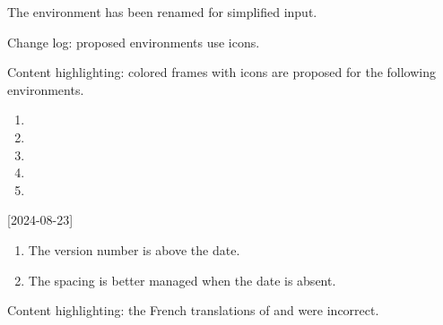 \begin{tdocbreak}
    \item The  environment has been renamed  for simplified input.
\end{tdocbreak}


\begin{tdocnew}
    \item Change log: proposed environments use icons.


    \item Content highlighting: colored frames with icons are proposed for the following environments.
    \bgroup
    \setlength\multicolsep{5pt}
    \begin{multicols}{3}
        \begin{enumerate}[topsep=0pt]
            \item {}
            \item {}
            \item {}
            \item {}
            \item {}
        \end{enumerate}
    \end{multicols}
    \egroup
\end{tdocnew}

\tdocsep




[2024-08-23]

\small

\begin{tdocupdate}
    \item {}
    \begin{enumerate}
        \item The version number is above the date.

        \item The spacing is better managed when the date is absent.
    \end{enumerate}
\end{tdocupdate}


\begin{tdocfix}
    \item Content highlighting: the French translations of  and  were incorrect.
\end{tdocfix}

\tdocsep


